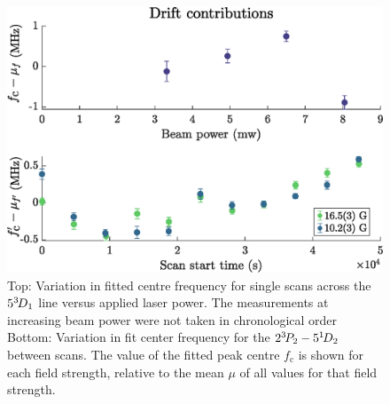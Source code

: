 

	


\begin{figure}
  \begin{minipage}[t]{0.6\textwidth}
  \vspace{0pt}
  \includegraphics[width=\textwidth]{fig/spectroscopy/power-drift-combined}
  \end{minipage}\hfill
  \begin{minipage}[t]{0.38\textwidth}
  \vspace{0pt}
\caption{Top: Variation in fitted centre frequency for single scans across the $5^{3\!} D_1$ line versus applied laser power.
	The measurements at increasing beam power were not taken in chronological order Bottom: Variation in fit center frequency for the $2^{3\!} P_2 - 5^{1\!} D_2$ between scans.
	The value of the fitted peak centre $f_\textrm{c}$ is shown for each field strength, relative to the mean $\mu$ of all values for that field strength.}
\label{fig:power_drift_combined}
  \end{minipage}
\end{figure}



